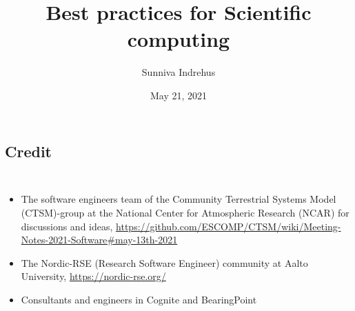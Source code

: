 \documentclass[usenames,dvipsnames]{beamer}
\theoremstyle{plain}
\theoremstyle{definition}
\begin{document}
\title{Best practices for Scientific computing}
 \institute{
A case study for NGI
 }

 \author{Sunniva Indrehus }


 \date{\scriptsize May 21, 2021}

 \vspace{-2.cm}
 \frame{
   \titlepage
   \thispagestyle{empty}
 }


\section{}
\subsection{Credit}


\begin{frame}{\setframetitle{}}
  {
    \begin{columns}
      \begin{itemize}
        \item The software engineers team of the Community Terrestrial Systems Model
          (CTSM)-group at the National Center for Atmospheric Research (NCAR)
          for discussions and ideas, \url{https://github.com/ESCOMP/CTSM/wiki/Meeting-Notes-2021-Software#may-13th-2021}
        \item The Nordic-RSE (Research Software Engineer) community at Aalto University,
            \url{https://nordic-rse.org/}
        \item Consultants and engineers in Cognite and BearingPoint 
        \end{itemize}

    \end{columns}
  }
\end{frame}
\end{document}
